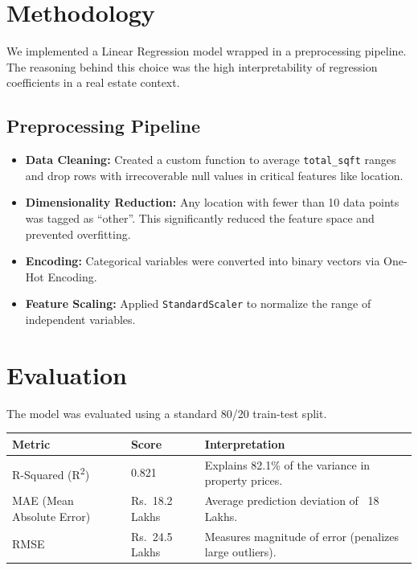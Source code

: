 \documentclass[12pt,a4paper]{article}
\newcommand{\rupee}{Rs.\ }
\begin{document}

\section{Methodology}

We implemented a Linear Regression model wrapped in a preprocessing pipeline. The reasoning behind this choice was the high interpretability of regression coefficients in a real estate context.

\subsection*{Preprocessing Pipeline}

\begin{itemize}
    \item \textbf{Data Cleaning:} Created a custom function to average \texttt{total\_sqft} ranges and drop rows with irrecoverable null values in critical features like location.
    \item \textbf{Dimensionality Reduction:} Any location with fewer than 10 data points was tagged as ``other''. This significantly reduced the feature space and prevented overfitting.
    \item \textbf{Encoding:} Categorical variables were converted into binary vectors via One-Hot Encoding.
    \item \textbf{Feature Scaling:} Applied \texttt{StandardScaler} to normalize the range of independent variables.
\end{itemize}


\section{Evaluation}

The model was evaluated using a standard 80/20 train-test split.

\begin{center}
\begin{tabular}{@{}lll@{}}
\toprule
\textbf{Metric} & \textbf{Score} & \textbf{Interpretation} \\
\midrule
R-Squared (R\textsuperscript{2}) & 0.821 & Explains 82.1\% of the variance in property prices. \\
MAE (Mean Absolute Error) & \rupee 18.2 Lakhs & Average prediction deviation of ~18 Lakhs. \\
RMSE & \rupee 24.5 Lakhs & Measures magnitude of error (penalizes large outliers). \\
\bottomrule
\end{tabular}
\end{center}
\end{document}
